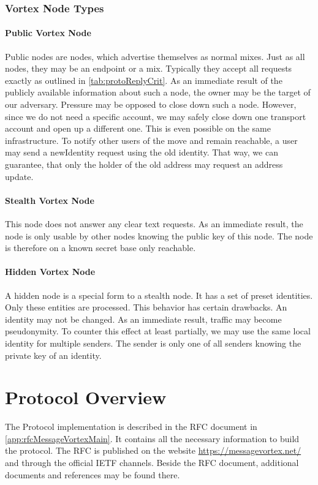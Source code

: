 \subsection{Vortex Node Types}

\subsubsection{Public Vortex Node}
Public nodes are nodes, which advertise themselves as normal mixes. Just as all nodes, they may be an endpoint or a mix. Typically they accept all requests exactly as outlined in \ref{tab:protoReplyCrit}. As an immediate result of the publicly available information about such a node, the owner may be the target of our adversary. Pressure may be opposed to close down such a node. However, since we do not need a specific account, we may safely close down one transport account and open up a different one. This is even possible on the same infrastructure. To notify other users of the move and remain reachable, a user may send a newIdentity request using the old identity. That way, we can guarantee, that only the holder of the old address may request an address update.

\subsubsection{Stealth Vortex Node\label{sec:stealthNode}}
This node does not answer any clear text requests. As an immediate result, the node is only usable by other nodes knowing the public key of this node. The node is therefore on a known secret base only reachable.

\subsubsection{Hidden Vortex Node\label{sec:hiddenNode}}
A hidden node is a special form to a stealth node. It has a set of preset identities. Only these entities are processed. This behavior has certain drawbacks. An identity may not be changed. As an immediate result, traffic may become pseudonymity. To counter this effect at least partially, we may use the same local identity for multiple senders. The sender is only one of all senders knowing the private key of an identity.

\chapter{Protocol Overview}
The Protocol implementation is described in the RFC document in \ref{app:rfcMessageVortexMain}. It contains all the necessary information to build the protocol. The RFC is published on the website \url{https://messagevortex.net/} and through the official IETF channels. Beside the RFC document, additional documents and references may be found there.

